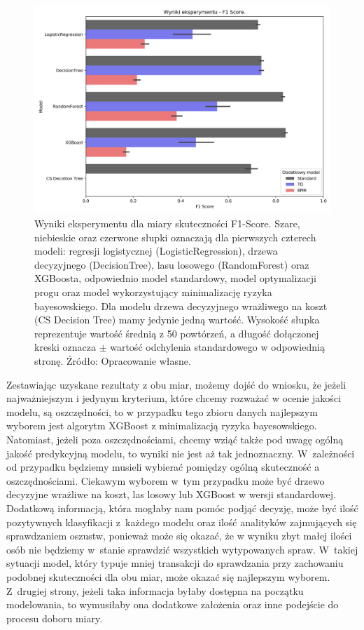 \documentclass[inzynierska]{pwr_wmat_praca_dyplomowa}
\theoremstyle{plain}
\numberwithin{theorem}{chapter}
\theoremstyle{definition}
\numberwithin{theorem}{chapter}
\begin{document}
\begin{figure}[h]
	\includegraphics[width=\linewidth]{images/100_config1-F1.png}
	\caption{Wyniki eksperymentu dla miary skuteczności F1-Score. Szare, niebieskie oraz czerwone słupki oznaczają dla pierwszych czterech modeli: regresji logistycznej (LogisticRegression), drzewa decyzyjnego (DecisionTree), lasu losowego (RandomForest) oraz XGBoosta, odpowiednio model standardowy, model optymalizacji progu oraz model wykorzystujący minimalizację ryzyka bayesowskiego. Dla modelu drzewa decyzyjnego wrażliwego na koszt (CS Decision Tree) mamy jedynie jedną wartość. Wysokość słupka reprezentuje wartość średnią z 50 powtórzeń, a długość dołączonej kreski oznacza $\pm$ wartość odchylenia standardowego w odpowiednią stronę. Źródło: Opracowanie własne.}
	\label{fig:results-f1}
\end{figure}

Zestawiając uzyskane rezultaty z obu miar, możemy dojść do wniosku, że jeżeli najważniejszym i jedynym kryterium, które chcemy rozważać w ocenie jakości modelu, są oszczędności, to w przypadku tego zbioru danych najlepszym wyborem jest algorytm XGBoost z minimalizacją ryzyka bayesowskiego. Natomiast, jeżeli poza oszczędnościami, chcemy wziąć także pod uwagę ogólną jakość predykcyjną modelu, to wyniki nie jest aż tak jednoznaczny. W~zależności od przypadku będziemy musieli wybierać pomiędzy ogólną skuteczność a oszczędnościami. Ciekawym wyborem w~tym przypadku może być drzewo decyzyjne wrażliwe na koszt, las losowy lub XGBoost w wersji standardowej. Dodatkową informacją, która mogłaby nam pomóc podjąć decyzję, może być ilość pozytywnych klasyfikacji z~każdego modelu oraz ilość analityków zajmujących się sprawdzaniem oszustw, ponieważ może się okazać, że w wyniku zbyt małej ilości osób nie będziemy w~stanie sprawdzić wszystkich wytypowanych spraw. W~takiej sytuacji model, który typuje mniej transakcji do sprawdzania przy zachowaniu podobnej skuteczności dla obu miar, może okazać się najlepszym wyborem. Z~drugiej strony, jeżeli taka informacja byłaby dostępna na początku modelowania, to wymusiłaby ona dodatkowe założenia oraz inne podejście do procesu doboru miary.
\end{document}
